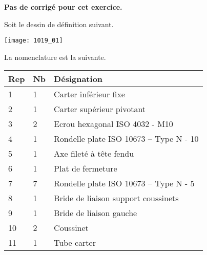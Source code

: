 \normalfalse \difficiletrue \tdifficilefalse
\correctionfalse

\setcounter{numques}{0}

\ifcorrection
\else
\textbf{Pas de corrigé pour cet exercice.}
\fi

\ifprof
\else
Soit le dessin de définition suivant. 
\begin{center}
\texttt{[image: 1019\_01]}
\end{center}
\fi
La nomenclature est la suivante. 

\begin{center}
\begin{tabular}{|l|l|l|}
\hline
Rep & Nb  & Désignation \\ \hline \hline %
1 & 1 & Carter inférieur fixe  \\ \hline %
2&
1&
Carter supérieur pivotant\\ \hline %
3&
2 &
Ecrou hexagonal ISO 4032 - M10 \\ \hline %
4&
1&
Rondelle plate ISO 10673 – Type N - 10 \\ \hline %
5&
1&
Axe fileté à tête fendu \\ \hline %
6&
1&
Plat de fermeture%
\\ \hline %
7&
7&
Rondelle plate ISO 10673 -- Type N - 5 \\ \hline %
8&
1&
Bride de liaison support coussinets \\ \hline %
9&
1&
Bride de liaison gauche \\ \hline %
10&
2&
Coussinet \\ \hline %
11&
1&
Tube carter \\ \hline %

\end{tabular}
\end{center}

